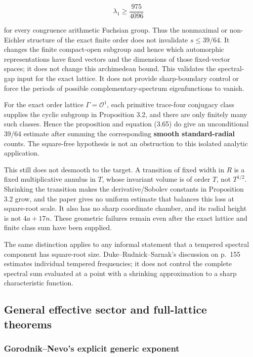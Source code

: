 \[
 \lambda_1\geq\frac{975}{4096}
\]

for every congruence arithmetic Fuchsian group. Thus the nonmaximal or
non-Eichler structure of the exact finite order does not invalidate
\(s\leq39/64\).  It changes the finite compact-open subgroup and hence which
automorphic representations have fixed vectors and the dimensions of those
fixed-vector spaces; it does not change this archimedean bound. This
validates the spectral-gap input for the exact lattice. It does not provide
sharp-boundary control or force the periods of possible
complementary-spectrum eigenfunctions to vanish.

For the exact order lattice \(\Gamma=\mathcal O^1\), each primitive trace-four conjugacy class supplies the cyclic subgroup in Proposition 3.2, and there are only finitely many such classes. Hence the proposition and equation (3.65) do give an unconditional \(39/64\) estimate after summing the corresponding \textbf{smooth standard-radial} counts. The square-free hypothesis is not an obstruction to this isolated analytic application.

This still does not desmooth to the target. A transition of fixed width in \(R\) is a fixed multiplicative annulus in \(T\), whose invariant volume is of order \(T\), not \(T^{1/2}\). Shrinking the transition makes the derivative/Sobolev constants in Proposition 3.2 grow, and the paper gives no uniform estimate that balances this loss at square-root scale. It also has no sharp coordinate chamber, and its radial height is not \(4a+17n\). These geometric failures remain even after the exact lattice and finite class sum have been supplied.

The same distinction applies to any informal statement that a tempered spectral component has square-root size. Duke--Rudnick--Sarnak's discussion on p.~155 estimates individual tempered frequencies; it does not control the complete spectral sum evaluated at a point with a shrinking approximation to a sharp characteristic function.

\subsection{General effective sector and full-lattice theorems}\label{koide-lit-general-effective-sector-and-full-lattice-theorems}

\subsubsection{Gorodnik--Nevo's explicit generic exponent}\label{koide-lit-gorodniknevos-explicit-generic-exponent}

